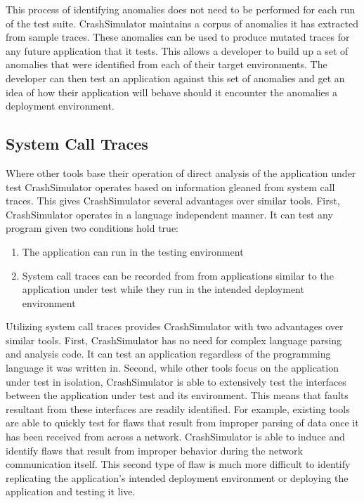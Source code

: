         This process of identifying anomalies does not need to be performed for each run of the test suite.
        CrashSimulator maintains a corpus of anomalies it has extracted from sample traces. These anomalies can be used
        to produce mutated traces for any future application that it tests. This allows a developer to build up a set of
        anomalies that were identified from each of their target environments. The developer can then test an
        application against this set of anomalies and get an idea of how their application will behave should it
        encounter the anomalies a deployment environment.

    \subsection{System Call Traces}

        Where other tools base their operation of direct analysis of the application under test CrashSimulator operates
        based on information gleaned from system call traces. This gives CrashSimulator several advantages over similar
        tools. First, CrashSimulator operates in a language independent manner. It can test any program given two
        conditions hold true:

        \begin{enumerate}
            \item{The application can run in the testing environment}
            \item{System call traces can be recorded from from applications similar to the application under test while
                they run in the intended deployment environment}
        \end{enumerate}

        Utilizing system call traces provides CrashSimulator with two advantages over similar tools. First,
        CrashSimulator has no need for complex language parsing and analysis code. It can test an application regardless
        of the programming language it was written in. Second, while other tools focus on the application under test in
        isolation, CrashSimulator is able to extensively test the interfaces between the application under test and its
        environment. This means that faults resultant from these interfaces are readily identified. For example,
        existing tools are able to quickly test for flaws that result from improper parsing of data once it
        has been received from across a network. CrashSimulator is able to induce and identify flaws that result from
        improper behavior during the network communication itself. This second type of flaw is much more difficult to
        identify replicating the application's intended deployment environment or deploying the application and testing
        it live.
